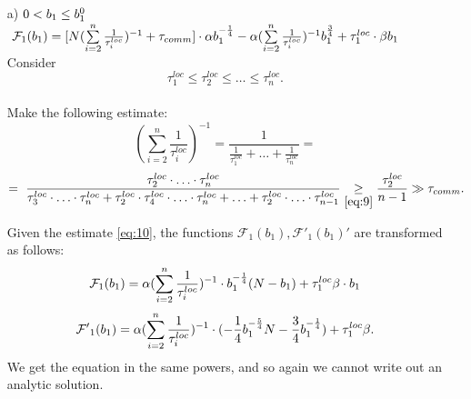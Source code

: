 \documentclass{article}
\begin{document}
\begin{itemize}
    \item [a)] $0 < b_1 \leq b_1^0\\$
    $~\mathcal{F}_1(b_1) = [N (\sum\limits_{i = 2}^{n} \frac{1}{\tau_i^{loc}})^{-1} + \tau_{comm}]\cdot 
    \alpha  b_1^{-\frac{1}{4}} - 
    \alpha(\sum\limits_{i =
    2}^{n} \frac{1}{\tau_i^{loc}})^{-1} b_1^{\frac{3}{4}}  + \tau_1^{loc}\cdot\beta b_1\\$
    Consider
    \begin{equation}
        \label{eq:9}
        \tau_1^{loc} \leq \tau_2^{loc} \leq\ldots \leq \tau_n^{loc}.
    \end{equation}\\
    Make the following estimate:
    \begin{equation}
    \label{eq:10}
      (\sum\limits_{i = 2}^n \frac{1}{\tau_i^{loc}})^{-1} = \frac{1}{\frac{1}{\tau_1^{loc}} + \ldots + \frac{1}{\tau_n^{loc}}} = 
    \end{equation}
    \begin{equation}
         \notag
         = ~
        \frac{\tau_2^{loc}\cdot \ldots \cdot\tau_n^{loc}}{\tau_3^{loc}\cdot \ldots \cdot\tau_n^{loc} + \tau_2^{loc}\cdot \tau_4^{loc}\cdot\ldots \cdot\tau_n^{loc} + \ldots + \tau_2^{loc}\cdot \ldots \cdot\tau_{n-1}^{loc}} \underset{\eqref{eq:9}}{\geq}\frac{\tau_2^{loc}}{n - 1} \gg \tau_{comm}.
    \end{equation}
   
    Given the estimate \eqref{eq:10}, the functions $\mathcal{F}_1(b_1), \mathcal{F'}_1(b_1)'$ are transformed as follows:
    \begin{eqnarray}
        \notag
        \begin{split}
            \mathcal{F}_1(b_1) = \alpha(\sum\limits_{i = 2}^n \frac{1}{\tau_i^{loc}})^{-1}\cdot b_1^{-\frac{1}{4}}(N - b_1) + \tau_1^{loc}\beta\cdot b_1
        \end{split}
    \end{eqnarray}
    \begin{equation}
    \notag
        \mathcal{F'}_1 (b_1) = \alpha(\sum\limits_{i = 2}^n \frac{1}{\tau_i^{loc}})^{-1}\cdot (-\frac{1}{4}b_1^{-\frac{5}{4}}N - \frac{3}{4}b_1^{-\frac{1}{4}}) + \tau_1^{loc}\beta.
    \end{equation}
    We get the equation in the same powers, and so again we cannot write out an analytic solution.


\end{itemize}
\end{document}

